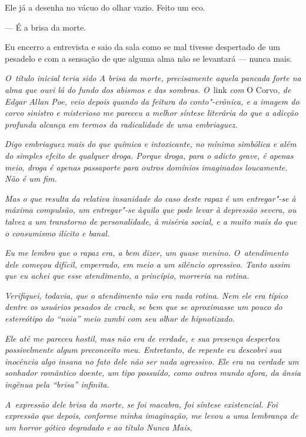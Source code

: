 Ele já a desenha no vácuo do olhar vazio. Feito um eco.

— É a brisa da morte.

Eu encerro a entrevista e saio da sala como se mal tivesse despertado de
um pesadelo e com a sensação de que alguma alma não se levantará ---
nunca mais.~

\begin{center}\asterisc{}\end{center}
\begingroup\small

\emph{O~título inicial teria sido A brisa da morte, precisamente aquela
pancada forte na alma que ouvi lá do fundo dos abismos e das sombras. O}~link \emph{com} O Corvo\emph{, de Edgar Allan Poe, veio depois quando da feitura do
conto"-crônica, e a imagem do corvo sinistro e misterioso me pareceu a
melhor síntese literária do que a adicção profunda alcança em termos da
radicalidade de uma embriaguez.}

\emph{Digo embriaguez mais do que química e intoxicante, no mínimo
simbólica e além do simples efeito de qualquer droga. Porque droga, para
o adicto grave, é apenas meio, droga é apenas passaporte para outros
domínios imaginados loucamente. Não é um fim.}

\emph{Mas o que resulta da relativa insanidade do caso deste rapaz é um
entregar"-se à máxima compulsão, um entregar"-se àquilo que pode levar à
depressão severa, ou talvez a um transtorno de personalidade, à miséria
social, e a muito mais do que o consumismo ilícito e banal.}

\emph{Eu me lembro que o rapaz era, a bem dizer, um quase menino. O~atendimento dele começou difícil, emperrado, em meio a um silêncio
opressivo. Tanto assim que eu achei que esse atendimento, a princípio,
morreria na rotina.}

\emph{Verifiquei, todavia, que o atendimento não era nada rotina. Nem
ele era típico dentre os usuários pesados de crack, se bem que se
aproximasse um pouco do estereótipo do ``noia'' meio zumbi com seu olhar
de hipnotizado.}

\emph{Ele até me pareceu hostil, mas não era de verdade, e sua presença
despertou possivelmente algum preconceito meu. Entretanto, de repente eu
descobri sua inocência algo insana no fato dele não ser nada agressivo.
Ele era na verdade um sonhador romântico doente, um tipo possuído, como
outros mundo afora, da ânsia ingênua pela ``brisa'' infinita.}

\emph{A~expressão dele brisa da morte, se foi macabra, foi síntese
existencial. Foi expressão que depois, conforme minha imaginação, me
levou a uma lembrança de um horror gótico degradado e ao título Nunca
Mais.}

